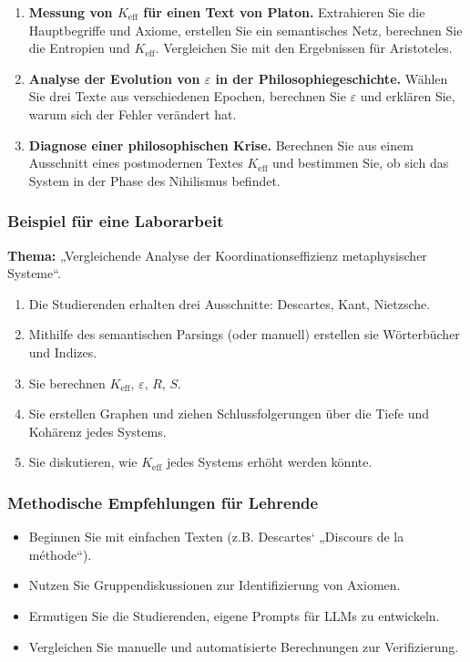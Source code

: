 \documentclass[12pt,a4paper]{article}
\newcommand{\eps}{\varepsilon}
\begin{document}
	\begin{enumerate}[label=(\arabic*)]
		\item \textbf{Messung von \(K_{\mathrm{eff}}\) für einen Text von Platon.} Extrahieren Sie die Hauptbegriffe und Axiome, erstellen Sie ein semantisches Netz, berechnen Sie die Entropien und \(K_{\mathrm{eff}}\). Vergleichen Sie mit den Ergebnissen für Aristoteles.
		\item \textbf{Analyse der Evolution von \(\eps\) in der Philosophiegeschichte.} Wählen Sie drei Texte aus verschiedenen Epochen, berechnen Sie \(\eps\) und erklären Sie, warum sich der Fehler verändert hat.
		\item \textbf{Diagnose einer philosophischen Krise.} Berechnen Sie aus einem Ausschnitt eines postmodernen Textes \(K_{\mathrm{eff}}\) und bestimmen Sie, ob sich das System in der Phase des Nihilismus befindet.
	\end{enumerate}
	
	\subsubsection{Beispiel für eine Laborarbeit}
	
	\textbf{Thema:} „Vergleichende Analyse der Koordinationseffizienz metaphysischer Systeme“.
	
	\begin{enumerate}
		\item Die Studierenden erhalten drei Ausschnitte: Descartes, Kant, Nietzsche.
		\item Mithilfe des semantischen Parsings (oder manuell) erstellen sie Wörterbücher und Indizes.
		\item Sie berechnen \(K_{\mathrm{eff}}\), \(\eps\), \(R\), \(S\).
		\item Sie erstellen Graphen und ziehen Schlussfolgerungen über die Tiefe und Kohärenz jedes Systems.
		\item Sie diskutieren, wie \(K_{\mathrm{eff}}\) jedes Systems erhöht werden könnte.
	\end{enumerate}
	
	\subsubsection{Methodische Empfehlungen für Lehrende}
	
	\begin{itemize}
		\item Beginnen Sie mit einfachen Texten (z.B. Descartes‘ „Discours de la méthode“).
		\item Nutzen Sie Gruppendiskussionen zur Identifizierung von Axiomen.
		\item Ermutigen Sie die Studierenden, eigene Prompts für LLMs zu entwickeln.
		\item Vergleichen Sie manuelle und automatisierte Berechnungen zur Verifizierung.
	\end{itemize}
	
\end{document}
